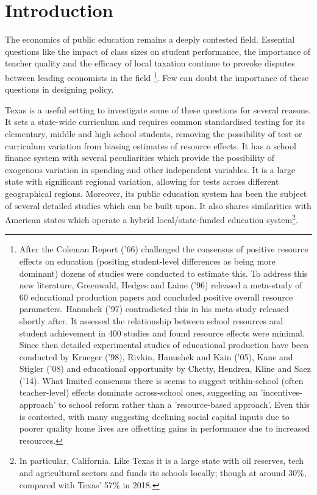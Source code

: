 \documentclass[11pt]{article}
\begin{document}
\setlength{\baselineskip}{0.3in} 

\tableofcontents
\clearpage

\section{Introduction}
\label{s:intro}

The economics of public education remains a deeply contested field. Essential questions like the impact of class sizes on student performance, the importance of teacher quality and the efficacy of local taxation continue to provoke disputes between leading economists in the field \footnote{After the Coleman Report ('66) challenged the consensus of positive resource effects on education (positing student-level differences as being more dominant) dozens of studies were conducted to estimate this. To address this new literature, Greenwald, Hedges and Laine ('96) released a meta-study of 60 educational production papers and concluded positive overall resource parameters. Hanushek ('97) contradicted this in his meta-study released shortly after. It assessed the relationship between school resources and student achievement in 400 studies and found resource effects were minimal. Since then detailed experimental studies of educational production have been conducted by Krueger ('98), Rivkin, Hanushek and Kain ('05), Kane and Stigler ('08) and educational opportunity by Chetty, Hendren, Kline and Saez ('14). What limited consensus there is seems to suggest within-school (often teacher-level) effects dominate across-school ones, suggesting an 'incentives-approach' to school reform rather than a 'resource-based approach'. Even this is contested, with many suggesting declining social capital inputs due to poorer quality home lives are offsetting gains in performance due to increased resources.}. Few can doubt the importance of these questions in designing policy. 

Texas is a useful setting to investigate some of these questions for several reasons. It sets a state-wide curriculum and requires common standardised testing for its elementary, middle and high school students, removing the possibility of test or curriculum variation from biasing estimates of resource effects. It has a school finance system with several peculiarities which provide the possibility of exogenous variation in spending and other independent variables. It is a large state with significant regional variation, allowing for tests across different geographical regions. Moreover, its public education system has been the subject of several detailed studies which can be built upon. It also shares similarities with American states which operate a hybrid local/state-funded education system\footnote{In particular, California. Like Texas it is a large state with oil reserves, tech and agricultural sectors and funds its schools locally; though at around 30\%, compared with Texas' 57\% in 2018.}.
\end{document}

